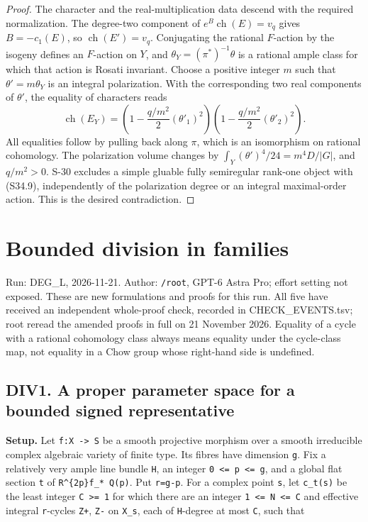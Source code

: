 \documentclass[11pt,a4paper]{article}
\theoremstyle{definition}
\begin{document}
\begin{proof}
The character and the real-multiplication data descend
with the required normalization. The degree-two component
of $e^B\operatorname{ch}(E)=v_q$ gives $B=-c_1(E)$,
so $\operatorname{ch}(E')=v_q$.
Conjugating the rational $F$-action by the isogeny
defines an $F$-action on $Y$, and
$\theta_Y=(\pi^*)^{-1}\theta$ is a rational ample class
for which that action is Rosati invariant. Choose a
positive integer $m$ such that $\theta'=m\theta_Y$
is an integral polarization. With the corresponding
two real components of $\theta'$, the equality of
characters reads
\[
 \operatorname{ch}(E_Y)
   =\left(1-\frac{q/m^2}{2}(\theta'_1)^2\right)
      \left(1-\frac{q/m^2}{2}(\theta'_2)^2\right).
 \tag{S34.9}
\]
All equalities follow by pulling back along $\pi$,
which is an isomorphism on rational cohomology. The
polarization volume changes by
$\int_Y(\theta')^4/24=m^4D/|G|$, and $q/m^2>0$.
S-30 excludes a simple gluable fully semiregular
rank-one object with (S34.9), independently of the
polarization degree or an integral maximal-order action.
This is the desired contradiction.
\end{proof}

\section{Bounded division in families}

Run: DEG\_L, 2026-11-21. Author: \texttt{/root}, GPT-6 Astra Pro; effort
setting not exposed. These are new formulations and proofs for this run.
All five have received an independent whole-proof check, recorded in
CHECK\_EVENTS.tsv; root reread the amended proofs in full on 21 November
2026. Equality of a cycle with a rational cohomology class always means
equality under the cycle-class map, not equality in a Chow group whose
right-hand side is undefined.

\subsection{DIV1. A proper parameter space for a bounded signed
representative}\label{bounded-division-div1.-a-proper-parameter-space-for-a-bounded-signed-representative}

\textbf{Setup.} Let \texttt{f:X\ -\textgreater{}\ S} be a smooth
projective morphism over a smooth irreducible complex algebraic variety
of finite type. Its fibres have dimension \texttt{g}. Fix a relatively
very ample line bundle \texttt{H}, an integer
\texttt{0\ \textless{}=\ p\ \textless{}=\ g}, and a global flat section
\texttt{t} of \texttt{R\^{}\{2p\}f\_*\ Q(p)}. Put \texttt{r=g-p}. For a
complex point \texttt{s}, let \texttt{c\_t(s)} be the least integer
\texttt{C\ \textgreater{}=\ 1} for which there are an integer
\texttt{1\ \textless{}=\ N\ \textless{}=\ C} and effective integral
\texttt{r}-cycles \texttt{Z+}, \texttt{Z-} on \texttt{X\_s}, each of
\texttt{H}-degree at most \texttt{C}, such that
\end{document}
